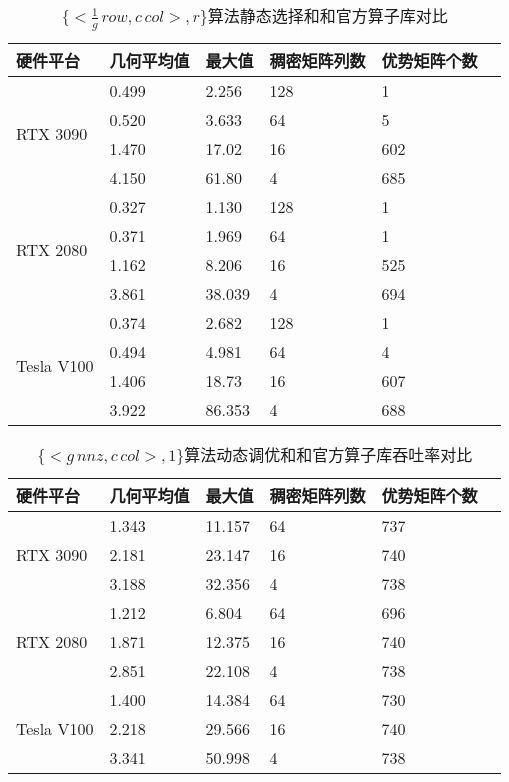 \begin{table}
  \centering
  \caption{$\{<\frac{1}{g}\,row , c\,col>,r\}$算法静态选择和和官方算子库对比}
  \begin{tabular}{llllll}
  \toprule
  硬件平台 & 几何平均值 & 最大值 & 稠密矩阵列数 & 优势矩阵个数 \\
  \midrule
  \multirow{4}{*}{RTX 3090}& 0.499 & 2.256 & 128 & 1\\
                           & 0.520 & 3.633 & 64 & 5\\
                           & 1.470 & 17.02 & 16 & 602\\
                           & 4.150 & 61.80 & 4 & 685\\
  \hline
  \multirow{4}{*}{RTX 2080}& 0.327 & 1.130 & 128 & 1\\
                          & 0.371 & 1.969  & 64 & 1\\
                          & 1.162 & 8.206  & 16 & 525\\
                          & 3.861 & 38.039 & 4 & 694\\
  \hline
  \multirow{4}{*}{Tesla V100}& 0.374 & 2.682 & 128 & 1\\
                          & 0.494 & 4.981  & 64 & 4\\
                          & 1.406 & 18.73  & 16 & 607\\
                          & 3.922 & 86.353  & 4 & 688\\
  \bottomrule
  \end{tabular}
  \label{tab:dy-cusp-rb}
\end{table}
\begin{table}
  \centering
  \caption{$\{<g\,nnz , c\,col>,1\}$算法动态调优和和官方算子库吞吐率对比}
  \begin{tabular}{llllll}
  \toprule
  硬件平台 & 几何平均值 & 最大值  & 稠密矩阵列数 & 优势矩阵个数 \\
  \midrule
  \multirow{3}{*}{RTX 3090}& 1.343 & 11.157 & 64 & 737\\
                           & 2.181 & 23.147  & 16 & 740\\
                           & 3.188 & 32.356  & 4 & 738\\
  \hline
  \multirow{3}{*}{RTX 2080}& 1.212 & 6.804  & 64 & 696\\
                          & 1.871 & 12.375  & 16 & 740\\
                          & 2.851 & 22.108  & 4 & 738\\
  \hline
  \multirow{3}{*}{Tesla V100}& 1.400 & 14.384  & 64 & 730\\
                          & 2.218 & 29.566 & 16 & 740\\
                          & 3.341 & 50.998  & 4 & 738\\
  \bottomrule
  \end{tabular}
  \label{tab:dy-cusp-eb-sr}
\end{table}